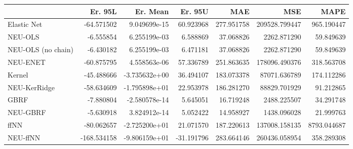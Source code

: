 \begin{tabular}{lrrrrrr}
\toprule
{} &     Er. 95L &      Er. Mean &    Er. 95U &         MAE &            MSE &         MAPE \\
\midrule
Elastic Net        &  -64.571502 &  9.049699e-15 &  60.923968 &  277.951758 &  209528.799447 &   965.190447 \\
NEU-OLS            &   -6.555854 &  6.255199e-03 &   6.588869 &   37.068826 &    2262.871290 &    59.849639 \\
NEU-OLS (no chain) &   -6.430182 &  6.255199e-03 &   6.471181 &   37.068826 &    2262.871290 &    59.849639 \\
NEU-ENET           &  -60.875795 &  4.558563e-06 &  57.336789 &  251.863635 &  178096.490376 &   318.563708 \\
Kernel             &  -45.488666 & -3.735632e+00 &  36.494107 &  183.073378 &   87071.636789 &   174.112286 \\
NEU-KerRidge       &  -58.634609 & -1.795898e+01 &  22.953978 &  186.281270 &   88829.701929 &    91.212865 \\
GBRF               &   -7.880804 & -2.580578e-14 &   5.645051 &   16.719248 &    2488.225507 &    34.291748 \\
NEU-GBRF           &   -5.630918 &  3.824912e-14 &   5.052422 &   14.958927 &    1438.096028 &    21.999763 \\
ffNN               &  -80.062657 & -2.725200e+01 &  21.071570 &  187.220613 &  137008.158135 &  8793.044687 \\
NEU-ffNN           & -168.534158 & -9.806159e+01 & -31.191796 &  283.664146 &  260436.058954 &   358.289308 \\
\bottomrule
\end{tabular}
